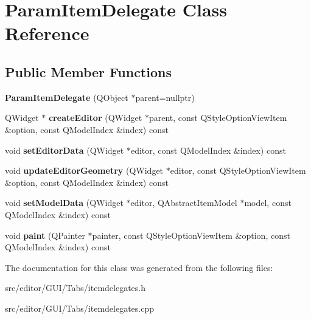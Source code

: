 \hypertarget{class_param_item_delegate}{\section{\-Param\-Item\-Delegate \-Class \-Reference}
\label{class_param_item_delegate}
}
\subsection*{\-Public \-Member \-Functions}
\begin{DoxyCompactItemize}
\item 
\hypertarget{class_param_item_delegate_a6acb9a6811ec974fc85697e56ceaec41}{{\bfseries \-Param\-Item\-Delegate} (\-Q\-Object $\ast$parent=nullptr)}\label{class_param_item_delegate_a6acb9a6811ec974fc85697e56ceaec41}

\item 
\hypertarget{class_param_item_delegate_a68e901c9ac85ccc1cbaca2b64fe69f10}{\-Q\-Widget $\ast$ {\bfseries create\-Editor} (\-Q\-Widget $\ast$parent, const \-Q\-Style\-Option\-View\-Item \&option, const \-Q\-Model\-Index \&index) const }\label{class_param_item_delegate_a68e901c9ac85ccc1cbaca2b64fe69f10}

\item 
\hypertarget{class_param_item_delegate_a798243552904b05a3cfbb466ed787ee0}{void {\bfseries set\-Editor\-Data} (\-Q\-Widget $\ast$editor, const \-Q\-Model\-Index \&index) const }\label{class_param_item_delegate_a798243552904b05a3cfbb466ed787ee0}

\item 
\hypertarget{class_param_item_delegate_a242c364371adb8f5bc44feeb6aced31f}{void {\bfseries update\-Editor\-Geometry} (\-Q\-Widget $\ast$editor, const \-Q\-Style\-Option\-View\-Item \&option, const \-Q\-Model\-Index \&index) const }\label{class_param_item_delegate_a242c364371adb8f5bc44feeb6aced31f}

\item 
\hypertarget{class_param_item_delegate_aab30c96a59e7166c2039626745aebefa}{void {\bfseries set\-Model\-Data} (\-Q\-Widget $\ast$editor, \-Q\-Abstract\-Item\-Model $\ast$model, const \-Q\-Model\-Index \&index) const }\label{class_param_item_delegate_aab30c96a59e7166c2039626745aebefa}

\item 
\hypertarget{class_param_item_delegate_a75bcc9149ab30a12101461cccaf043c4}{void {\bfseries paint} (\-Q\-Painter $\ast$painter, const \-Q\-Style\-Option\-View\-Item \&option, const \-Q\-Model\-Index \&index) const }\label{class_param_item_delegate_a75bcc9149ab30a12101461cccaf043c4}

\end{DoxyCompactItemize}


\-The documentation for this class was generated from the following files\-:\begin{DoxyCompactItemize}
\item 
src/editor/\-G\-U\-I/\-Tabs/itemdelegates.\-h\item 
src/editor/\-G\-U\-I/\-Tabs/itemdelegates.\-cpp\end{DoxyCompactItemize}
